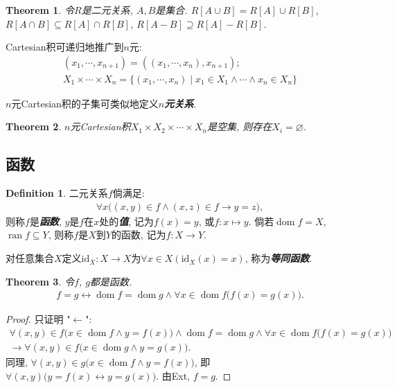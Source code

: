 \documentclass[UTF8,AutoFakeBold]{ctexart}
\theoremstyle{plain}
\newtheorem{theorem}{Theorem}[section] %
\theoremstyle{definition}
\newtheorem{definition}{Definition}[section] %
\newcommand*{\indexbf}[1]{\textit{\textbf{#1}}\index{#1}}
\newcommand*{\id}{\mathrm{id}}
\DeclareMathOperator{\dom}{dom}
\DeclareMathOperator{\ran}{ran}
\begin{document}
\begin{theorem}
令$R$是二元关系, $A,B$是集合. $R[ A\cup B] = R[A] \cup R[B]$, $R[ A\cap B] \subseteq R[A]\cap R[B]$, $R[A -B] \supseteq R[A] - R[B]$.
\end{theorem}

Cartesian积可递归地推广到$n$元: 
\begin{align}
	(x_1,\cdots,x_{n+1}) = ( (x_1,\cdots,x_n),x_{n+1});\\
	X_1\times\cdots\times X_n = \{ (x_1,\cdots, x_n)\mid x_1\in X_1\wedge\cdots \wedge x_n\in X_n\} 
\end{align}

$n$元Cartesian积的子集可类似地定义\indexbf{$n$元关系}.

\begin{theorem}
$n$元Cartesian积$X_1\times X_2\times \cdots \times X_n$是空集, 则存在$X_i = \varnothing$.
\end{theorem}

\subsection{函数}

\begin{definition}\label{function}
二元关系$f$倘满足: 
\begin{align*}
	\forall x\big(
		(x,y)\in f\wedge (x,z)\in f \to y=z\big),
\end{align*}
则称$f$是\indexbf{函数}, $y$是$f$在$x$处的\indexbf{值}, 记为$f(x) = y$, 或$f\colon x\mapsto y$. 倘若$\dom f = X$, $\ran f \subseteq Y$, 则称$f$是$X$到$Y$的函数, 记为$f\colon X\to Y$. 
\end{definition}

对任意集合$X$定义$\id _X \colon X\to X$为$\forall x\in X(\id _X(x)=x)$, 称为\indexbf{等同函数}.

\begin{theorem}\label{equality_function}
令$f$, $g$都是函数.
\begin{align*}
	f=g\leftrightarrow 
		\dom f=\dom g \wedge \forall x\in \dom f \big(
			f(x)=g(x)\big). 
\end{align*}
\end{theorem}
\begin{proof}
只证明 "$\leftarrow$":
\begin{align*}
	\forall (x,y)\in f  \big(
		x\in \dom f\wedge y=f(x)\big) \wedge
		\dom f=\dom g \wedge \forall x\in \dom f \big(
			f(x)=g(x)\big) &\\\rightarrow
		\forall (x,y)\in f\big(
			x\in \dom g\wedge y=g(x)\big).
	\qquad\qquad&
\end{align*}
同理, $
\forall (x,y)\in g\big(
	x\in \dom f\wedge y=f(x)\big)$, 
即$\forall (x,y) \big(
	y=f(x)\leftrightarrow y=g(x)\big)$. 由Ext, $f=g$.
\end{proof}
\end{document}
